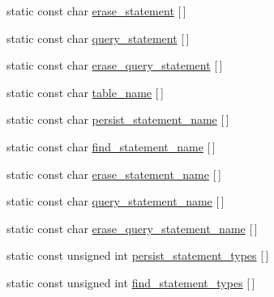 \begin{DoxyCompactItemize}
\item 
static const char \hyperlink{classodb_1_1access_1_1object__traits__impl_3_01_1_1_object_class_00_01id__pgsql_01_4_a37cd74ffdd1616b0257c5bbcd8ea9c8f}{erase\+\_\+statement} \mbox{[}$\,$\mbox{]}
\item 
static const char \hyperlink{classodb_1_1access_1_1object__traits__impl_3_01_1_1_object_class_00_01id__pgsql_01_4_a5f7e7bccf410f126d81bf75af2ba3b10}{query\+\_\+statement} \mbox{[}$\,$\mbox{]}
\item 
static const char \hyperlink{classodb_1_1access_1_1object__traits__impl_3_01_1_1_object_class_00_01id__pgsql_01_4_a067316d14ee5ed6e608b9d1e08efbfe3}{erase\+\_\+query\+\_\+statement} \mbox{[}$\,$\mbox{]}
\item 
static const char \hyperlink{classodb_1_1access_1_1object__traits__impl_3_01_1_1_object_class_00_01id__pgsql_01_4_ad940fdd97f399480a2afb4fcc9c97285}{table\+\_\+name} \mbox{[}$\,$\mbox{]}
\item 
static const char \hyperlink{classodb_1_1access_1_1object__traits__impl_3_01_1_1_object_class_00_01id__pgsql_01_4_a1f199daedabe2bec7ad2b79de6e84e3c}{persist\+\_\+statement\+\_\+name} \mbox{[}$\,$\mbox{]}
\item 
static const char \hyperlink{classodb_1_1access_1_1object__traits__impl_3_01_1_1_object_class_00_01id__pgsql_01_4_a9e6ca25235e42e74077f353102ed9fbb}{find\+\_\+statement\+\_\+name} \mbox{[}$\,$\mbox{]}
\item 
static const char \hyperlink{classodb_1_1access_1_1object__traits__impl_3_01_1_1_object_class_00_01id__pgsql_01_4_a77612a8801f048c14846e6c2775cc1ee}{erase\+\_\+statement\+\_\+name} \mbox{[}$\,$\mbox{]}
\item 
static const char \hyperlink{classodb_1_1access_1_1object__traits__impl_3_01_1_1_object_class_00_01id__pgsql_01_4_a74c352c8722348d97554b875804cace5}{query\+\_\+statement\+\_\+name} \mbox{[}$\,$\mbox{]}
\item 
static const char \hyperlink{classodb_1_1access_1_1object__traits__impl_3_01_1_1_object_class_00_01id__pgsql_01_4_ad91b7c0f8c31460c49cab60ab0727deb}{erase\+\_\+query\+\_\+statement\+\_\+name} \mbox{[}$\,$\mbox{]}
\item 
static const unsigned int \hyperlink{classodb_1_1access_1_1object__traits__impl_3_01_1_1_object_class_00_01id__pgsql_01_4_aab103efc914110b52c780de8d0117a23}{persist\+\_\+statement\+\_\+types} \mbox{[}$\,$\mbox{]}
\item 
static const unsigned int \hyperlink{classodb_1_1access_1_1object__traits__impl_3_01_1_1_object_class_00_01id__pgsql_01_4_a6aefb5775973f0e5da1825240ac82b42}{find\+\_\+statement\+\_\+types} \mbox{[}$\,$\mbox{]}
\end{DoxyCompactItemize}


